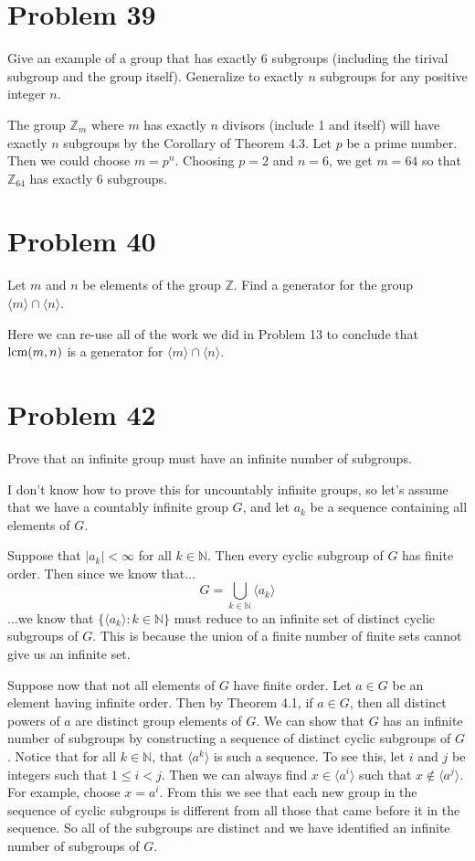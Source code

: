 \documentclass{article}
\begin{document}
\section*{Problem 39}

Give an example of a group that has exactly 6 subgroups (including the
tirival subgroup and the group itself).  Generalize to exactly $n$
subgroups for any positive integer $n$.

The group $\mathbb{Z}_m$ where $m$ has exactly $n$ divisors (include 1 and itself)
will have exactly $n$ subgroups by the Corollary of Theorem 4.3.  Let $p$ be a prime
number.  Then we could choose $m=p^n$.  Choosing $p=2$ and $n=6$, we get $m=64$
so that $\mathbb{Z}_{64}$ has exactly 6 subgroups.

\section*{Problem 40}

Let $m$ and $n$ be elements of the group $\mathbb{Z}$.  Find a generator for the
group $\langle m\rangle\cap\langle n\rangle$.

Here we can re-use all of the work we did in Problem 13 to conclude that $\mbox{lcm}(m,n)$
is a generator for $\langle m\rangle\cap\langle n\rangle$.

\section*{Problem 42}

Prove that an infinite group must have an infinite number of subgroups.

I don't know how to prove this for uncountably infinite groups, so let's
assume that we have a countably infinite group $G$, and let $a_k$ be
a sequence containing all elements of $G$.

Suppose that $|a_k|<\infty$ for all $k\in\mathbb{N}$.
Then every cyclic subgroup of $G$ has finite order.
Then since we know that...
\begin{equation*}
G = \bigcup_{k\in\mathbb{N}}\langle a_k\rangle
\end{equation*}
...we know that $\{\langle a_k\rangle:k\in\mathbb{N}\}$ must reduce to
an infinite set of distinct cyclic subgroups of $G$.  This is because
the union of a finite number of finite sets cannot give us an infinite set.

Suppose now that not all elements of $G$ have finite order.
Let $a\in G$ be an element having infinite order.
Then by Theorem 4.1, if $a\in G$, then all
distinct powers of $a$ are distinct group elements of $G$.  We can show that
$G$ has an infinite number of subgroups by constructing a sequence of distinct
cyclic subgroups of $G$.  Notice that for all $k\in\mathbb{N}$, that
$\langle a^k\rangle$ is such a sequence.  To see this, let $i$ and $j$
be integers such that $1\leq i<j$.  Then we can always find $x\in\langle a^i\rangle$
such that $x\not\in\langle a^j\rangle$.  For example, choose $x=a^i$.  From this
we see that each new group in the sequence of cyclic subgroups is different from
all those that came before it in the sequence.
So all of the subgroups are distinct and we have identified
an infinite number of subgroups of $G$.
\end{document}
